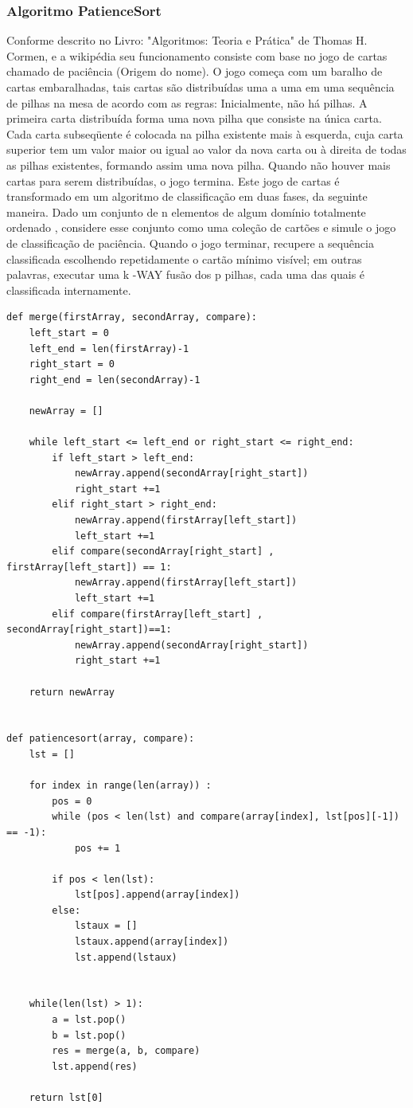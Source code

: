 \documentclass[a4paper,12pt]{scrartcl}
\begin{document}
\subsubsection{Algoritmo PatienceSort}
Conforme descrito no Livro: "Algoritmos: Teoria e Prática" de Thomas H. Cormen, e a wikipédia seu funcionamento consiste com base no jogo de cartas chamado de paciência (Origem do nome). O jogo começa com um baralho de cartas embaralhadas, tais cartas são distribuídas uma a uma em uma sequência de pilhas na mesa de acordo com as regras: Inicialmente, não há pilhas. A primeira carta distribuída forma uma nova pilha que consiste na única carta. Cada carta subseqüente é colocada na pilha existente mais à esquerda, cuja carta superior tem um valor maior ou igual ao valor da nova carta ou à direita de todas as pilhas existentes, formando assim uma nova pilha. Quando não houver mais cartas para serem distribuídas, o jogo termina.
Este jogo de cartas é transformado em um algoritmo de classificação em duas fases, da seguinte maneira. Dado um conjunto de n elementos de algum domínio totalmente ordenado , considere esse conjunto como uma coleção de cartões e simule o jogo de classificação de paciência. Quando o jogo terminar, recupere a sequência classificada escolhendo repetidamente o cartão mínimo visível; em outras palavras, executar uma k -WAY fusão dos p pilhas, cada uma das quais é classificada internamente.
\begin{lstlisting}
def merge(firstArray, secondArray, compare):
    left_start = 0
    left_end = len(firstArray)-1
    right_start = 0
    right_end = len(secondArray)-1
    
    newArray = []

    while left_start <= left_end or right_start <= right_end:
        if left_start > left_end:
            newArray.append(secondArray[right_start])
            right_start +=1
        elif right_start > right_end:
            newArray.append(firstArray[left_start])
            left_start +=1
        elif compare(secondArray[right_start] , firstArray[left_start]) == 1:
            newArray.append(firstArray[left_start])
            left_start +=1
        elif compare(firstArray[left_start] , secondArray[right_start])==1:
            newArray.append(secondArray[right_start])
            right_start +=1
    
    return newArray


def patiencesort(array, compare):
    lst = []

    for index in range(len(array)) :
        pos = 0
        while (pos < len(lst) and compare(array[index], lst[pos][-1]) == -1):
            pos += 1

        if pos < len(lst):
            lst[pos].append(array[index])
        else:
            lstaux = []
            lstaux.append(array[index])
            lst.append(lstaux)
    

    while(len(lst) > 1):
        a = lst.pop()
        b = lst.pop()
        res = merge(a, b, compare)
        lst.append(res)
    
    return lst[0]
\end{lstlisting}
\end{document}
